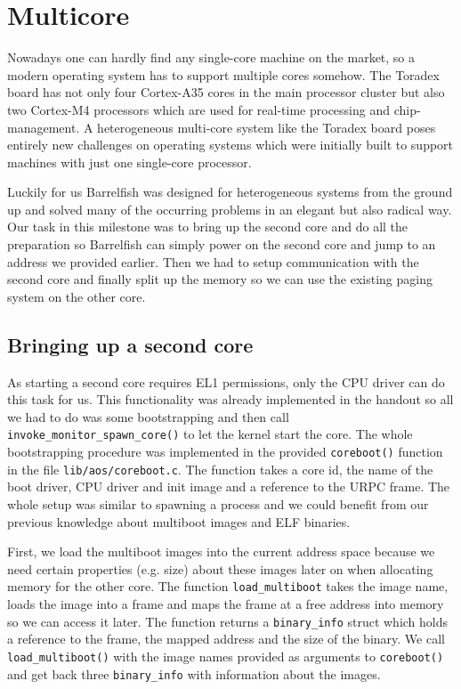 \chapter{Multicore}

Nowadays one can hardly find any single-core machine on the market, so
a modern operating system has to support multiple cores somehow. The
Toradex board has not only four Cortex-A35 cores in the main processor
cluster but also two Cortex-M4 processors which are used for real-time
processing and chip-management. A heterogeneous multi-core system like
the Toradex board poses entirely new challenges on operating systems
which were initially built to support machines with just one single-core
processor.

Luckily for us Barrelfish was designed for heterogeneous systems from the
ground up and solved many of the occurring problems in an elegant but also
radical way. Our task in this milestone was to bring up the second core
and do all the preparation so Barrelfish can simply power on the second core
and jump to an address we provided earlier. Then we had to setup communication
with the second core and finally split up the memory so we can use the existing
paging system on the other core.

\section{Bringing up a second core}

As starting a second core requires EL1 permissions, only the CPU driver can do
this task for us. This functionality was already implemented in the handout so
all we had to do was some bootstrapping and then call
\verb|invoke_monitor_spawn_core()| to let the kernel start the core. The whole
bootstrapping procedure was implemented in the provided \verb|coreboot()|
function in the file \verb|lib/aos/coreboot.c|. The function takes a core id, the
name of the boot driver, CPU driver and init image and a reference to the URPC frame.
The whole setup was similar to spawning a process and we could benefit from our previous
knowledge about multiboot images and ELF binaries.

First, we load the multiboot images into the current address space because we
need certain properties (e.g. size) about these images later on when allocating memory
for the other core. The function \verb|load_multiboot| takes the image name, loads the
image into a frame and maps the frame at a free address into memory so we can access it
later. The function returns a \verb|binary_info| struct which holds a reference to the
frame, the mapped address and the size of the binary. We call \verb|load_multiboot()|
with the image names provided as arguments to \verb|coreboot()| and get back three
\verb|binary_info| with information about the images.

